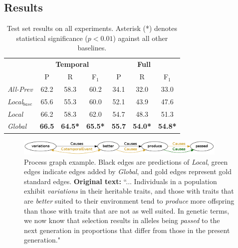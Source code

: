 \subsection{Results}

\begin{table}[t]
{\footnotesize
\begin{tabular}{| l | c | c | c | c | c | c |}
\hline
    & \multicolumn{3}{c|}{\textbf{Temporal}} & \multicolumn{3}{c|}{\textbf{Full}} \\
    & P & R & F$_1$ & P & R & F$_1$ \\
\hline
\hline
\emph{All-Prev} & 62.2 & 58.3 & 60.2 & 34.1 & 32.0 & 33.0 \\
\emph{Local$_{base}$} & 65.6 & 55.3 & 60.0 &  52.1 & 43.9 & 47.6\\
\emph{Local} & 66.2 & 58.3 & 62.0 & 54.7 & 48.3 & 51.3 \\
\emph{Global} & \textbf{66.5} & \textbf{64.5*} & \textbf{65.5*} & \textbf{55.7} & \textbf{54.0*} & \textbf{54.8*} \\
\hline
\end{tabular}}
\caption{Test set results on all experiments. Asterisk (*) denotes statistical significance ($p<0.01$) against all other baselines.}
\label{tab:results}
\end{table}


\begin{figure}[t]
\centering
\includegraphics[width=0.9\textwidth]{figures/p144.png} 
\caption{Process graph example. Black edges are predictions of \emph{Local}, green edges indicate edges added by \emph{Global}, and gold edges represent gold standard edges. \textbf{Original text:} ``... Individuals in a population exhibit \emph{variations} in their heritable traits, and those with traits that are \emph{better} suited to their environment tend to \emph{produce} more offspring than those with traits that are not as well suited. In genetic terms, we now know that selection results in alleles being \emph{passed} to the next generation in proportions that differ from those in the present generation."}
\label{fig:graph}
\end{figure}



